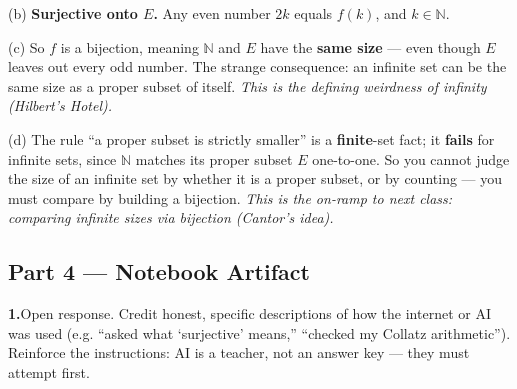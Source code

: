 \documentclass[12pt]{article}
\begin{document}
(b)\; \textbf{Surjective onto $E$.} Any even number $2k$ equals $f(k)$, and $k \in \mathbb{N}$.

(c)\; So $f$ is a bijection, meaning $\mathbb{N}$ and $E$ have the \textbf{same size} --- even though $E$ leaves
out every odd number. The strange consequence: an infinite set can be the same size as a proper subset of
itself. \textit{This is the defining weirdness of infinity (Hilbert's Hotel).}

(d)\; The rule ``a proper subset is strictly smaller'' is a \textbf{finite}-set fact; it \textbf{fails} for
infinite sets, since $\mathbb{N}$ matches its proper subset $E$ one-to-one. So you cannot judge the size of an
infinite set by whether it is a proper subset, or by counting --- you must compare by building a bijection.
\textit{This is the on-ramp to next class: comparing infinite sizes via bijection (Cantor's idea).}

\subsection*{Part 4 --- Notebook Artifact}

\textbf{1.}\quad Open response. Credit honest, specific descriptions of how the internet or AI was used (e.g.
``asked what `surjective' means,'' ``checked my Collatz arithmetic''). Reinforce the instructions: AI is a
teacher, not an answer key --- they must attempt first.
\end{document}

